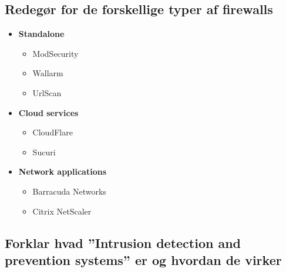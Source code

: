 \subsection{Redegør for de forskellige typer af firewalls}
\begin{itemize}
	\item \textbf{Standalone}
	\begin{itemize}
		\item ModSecurity
		\item Wallarm
		\item UrlScan
	\end{itemize}
	\item \textbf{Cloud services}
	\begin{itemize}
		\item CloudFlare
		\item Sucuri
	\end{itemize}
	\item \textbf{Network applications}
	\begin{itemize}
		\item Barracuda Networks
		\item Citrix NetScaler
	\end{itemize}
\end{itemize}

\subsection{Forklar hvad ”Intrusion detection and prevention systems” er og hvordan de virker}

